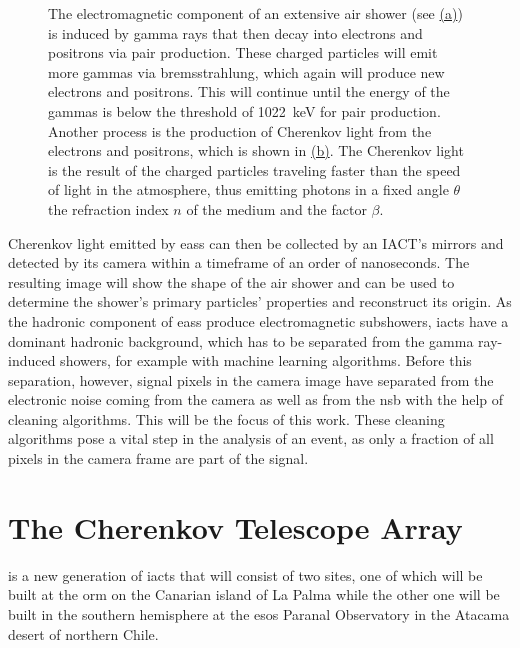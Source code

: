 \begin{figure}
\begin{subfigure}[t]{0.45\textwidth}
        \label{fig:cherenkov}
    \end{subfigure}
    \caption{The electromagnetic component of an extensive air shower (see \hyperref[fig:heitler_model]{(a)})
    is induced by gamma rays that then decay into electrons and positrons via pair production.
    These charged particles will emit more gammas via bremsstrahlung, which again will produce
    new electrons and positrons. This will continue until the energy of the gammas is below
    the threshold of \SI{1022}{\kilo\eV} for pair production. Another process is the production of
    Cherenkov light from the electrons and positrons, which is shown in \hyperref[fig:cherenkov]{(b)}.
    The Cherenkov light is the result of the charged particles traveling faster than the speed of light
    in the atmosphere, thus emitting photons in a fixed angle \(\theta\) \wrt the refraction index
    \(n\) of the medium and the factor \(\beta\).}
    \label{fig:cherenkov_heitler}
\end{figure}

Cherenkov light emitted by \glspl{eas} can then be collected by an IACT's mirrors and detected by
its camera within a timeframe of an order of nanoseconds. The resulting image will show the shape
of the air shower and can be used to determine the shower's primary particles' properties and
reconstruct its origin. As the hadronic component of \glspl{eas} produce
electromagnetic subshowers, \glspl{iact} have a dominant hadronic background, which has to be
separated from the gamma ray-induced showers, for example with
machine learning algorithms. Before this separation, however, signal pixels in the camera image have
separated from the electronic noise coming from the camera as well as from the \gls{nsb} with the help of
cleaning algorithms. This will be the focus of this work. These cleaning algorithms pose a vital step
in the analysis of an event, as only a fraction of all pixels in the camera frame are part of the signal.


\section{The Cherenkov Telescope Array}
\label{sec:cta}

\cta{} is a new generation of \glspl{iact} that will consist of two sites,
one of which will be built at the \gls{orm} on the Canarian island of La Palma while the other one
will be built in the southern hemisphere at the \glspl{eso} Paranal Observatory in the Atacama desert
of northern Chile.

